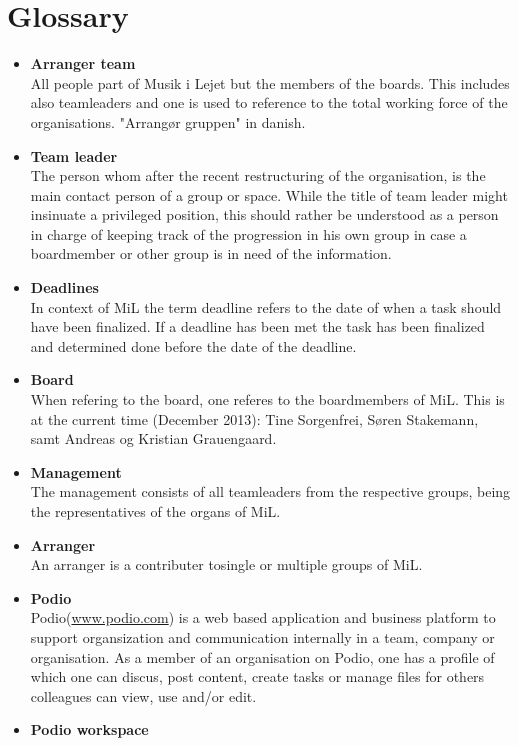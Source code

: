 \section{Glossary}
\begin{itemize}
	\item \textbf{Arranger team}\\
	All people part of Musik i Lejet but the members of the boards. This includes also teamleaders and one is used to reference to the total working force of the organisations. "Arrangør gruppen" in danish.
	\item \textbf{Team leader}\\
	The person whom after the recent restructuring of the organisation, is the main contact person of a group or space. While the title of team leader might insinuate a privileged position, this should rather be understood as a person in charge of keeping track of the progression in his own group in case a boardmember or other group is in need of the information.
	\item \textbf{Deadlines}\\
	In context of MiL the term deadline refers to the date of when a task should have been finalized. If a deadline has been met the task has been finalized and determined done before the date of the deadline.
	\item \textbf{Board}\\
	When refering to the board, one referes to the boardmembers of MiL. This is at the current time (December 2013): Tine Sorgenfrei, Søren Stakemann, samt Andreas og Kristian Grauengaard.
	\item \textbf{Management}\\
	The management consists of all teamleaders from the respective groups, being the representatives of the organs of MiL.
	\item \textbf{Arranger}\\
	An arranger is a contributer tosingle or multiple groups of MiL.
	\item \textbf{Podio}\\
	Podio(\href{www.podio.com}{www.podio.com}) is a web based application and business platform to support organsization and communication internally in a team, company or organisation. As a member of an organisation on Podio, one has a profile of which one can discus, post content, create tasks or manage files for others colleagues can view, use and/or edit.
	\item \textbf{Podio workspace} \\

\end{itemize}
